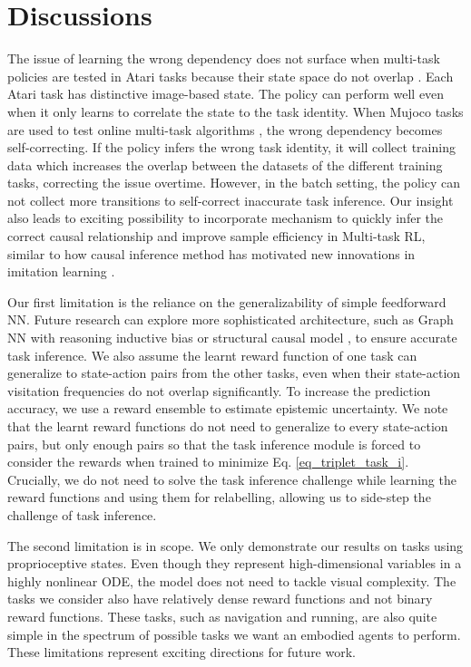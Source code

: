 \section{Discussions}

The issue of learning the wrong dependency does not surface when multi-task policies are tested in Atari tasks because their state space do not overlap \cite{ActorMimicParisotto2015,hessel2019multi,impala2018}.
Each Atari task has distinctive image-based state. The policy can perform well even when it only learns to correlate the state to the task identity. When Mujoco tasks are used to test online multi-task algorithms \cite{zintgraf2020varibad, fakoor2019meta}, the wrong dependency becomes self-correcting. If the policy infers the wrong task identity, it will collect training data which increases the overlap between the datasets of the different training tasks, correcting the issue overtime. However, in the batch setting, the policy can not collect more transitions to self-correct inaccurate task inference. Our insight also leads to exciting possibility to incorporate mechanism to quickly infer the correct causal relationship and improve sample efficiency in Multi-task RL, similar to how causal inference method has motivated new innovations in imitation learning \cite{de2019causal}. 

Our first limitation is the reliance on the generalizability of simple feedforward NN. Future research can explore more sophisticated architecture, such as Graph NN with reasoning inductive bias \cite{xu2019can,scarselli2008graph,wu2020comprehensive,zhou2018graph} or structural causal model \cite{pearl2010introduction, pearl2009causal}, to ensure accurate task inference. We also assume the learnt reward function of one task can generalize to state-action pairs from the other tasks, even when their state-action visitation frequencies do not overlap significantly. To increase the prediction accuracy, we use a reward ensemble to estimate epistemic uncertainty.
We note that the learnt reward functions do not need to generalize to every state-action pairs, but only enough pairs so that the task inference module is forced to consider the rewards when trained to minimize Eq. \ref{eq_triplet_task_i}. Crucially, we do not need to solve the task inference challenge while learning the reward functions and using them for relabelling, allowing us to side-step the challenge of task inference.

The second limitation is in scope. We only demonstrate our results on tasks using proprioceptive states. Even though they represent high-dimensional variables in a highly nonlinear ODE, the model does not need to tackle visual complexity. The tasks we consider also have relatively dense reward functions and not binary reward functions. These tasks, such as navigation and running, are also quite simple in the spectrum of possible tasks we want an embodied agents to perform. These limitations represent exciting directions for future work.

